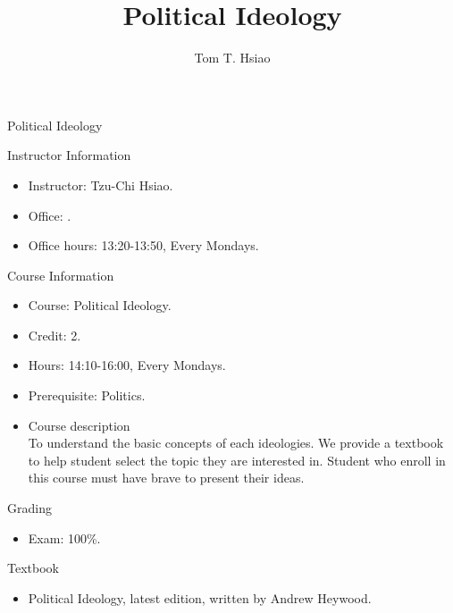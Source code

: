 \documentclass{article}
\title{Political Ideology}
\author{Tom T. Hsiao}
\date{}
\begin{document}
\begin{center}
\fontsize{16pt}{16pt}\selectfont Political Ideology \\
\end{center}
\fontsize{14pt}{14pt}\selectfont
\begin{flushleft}
Instructor Information
\end{flushleft}
\begin{itemize}
\item Instructor: Tzu-Chi Hsiao. \\
\item Office: . \\
\item Office hours: 13:20-13:50, Every Mondays. \\
\end{itemize}
Course Information \\
\begin{itemize}
\item Course: Political Ideology. \\
\item Credit: 2. \\
\item Hours: 14:10-16:00, Every Mondays. \\
\item Prerequisite: Politics. \\
\item Course description \\
To understand the basic concepts of each ideologies. We provide a textbook to help student select the topic they are interested in. Student who enroll in this course must have brave to present their ideas. \\
\end{itemize}
\begin{flushleft}
Grading \\
\end{flushleft}
\begin{itemize}
\item Exam: 100\%. \\
\end{itemize}
Textbook \\
\begin{itemize}
\item Political Ideology, latest edition, written by Andrew Heywood. \\
\end{itemize}
\end{document}

